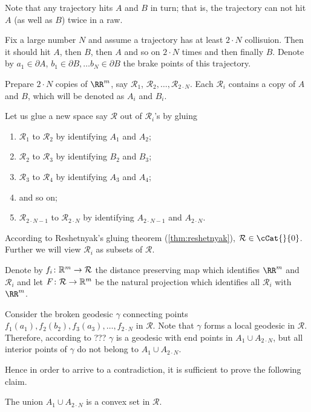 Note that any trajectory hits $A$ and $B$ in turn;
that is, the trajectory can not hit $A$ (as well as $B$)
twice in a raw.

Fix a large number $N$ and assume a trajectory has at least $2\cdot N$ collisuion.
Then it should hit $A$,
then $B$,
then $A$
and so on $2\cdot N$ times
and then finally $B$.
Denote by 
$a_1\in \partial A$, 
$b_1\in \partial B,
\dots
b_N\in \partial B$
the brake points of this trajectory.

Prepare $2\cdot N$ copies of $\RR^m$,
say $\mathcal{R}_1$, $\mathcal{R}_2,\dots,\mathcal{R}_{2\cdot N}$.
Each $\mathcal{R}_i$ contains a copy of $A$ and $B$, which will be denoted as $A_i$ and $B_i$.

Let us glue a new space say $\mathcal{R}$ out of $\mathcal{R}_i$'s
by gluing 
\begin{enumerate}
\item $\mathcal{R}_1$ to $\mathcal{R}_2$ by identifying $A_1$ and $A_2$;
\item $\mathcal{R}_2$ to $\mathcal{R}_3$  by identifying $B_2$ and $B_3$;
\item $\mathcal{R}_3$ to $\mathcal{R}_4$  by identifying $A_3$ and $A_4$;
\item and so on;
\item $\mathcal{R}_{2\cdot N-1}$ to $\mathcal{R}_{2\cdot N}$ by identifying $A_{2\cdot N-1}$ and $A_{2\cdot N}$.
\end{enumerate}
According to Reshetnyak's gluing theorem (\ref{thm:reshetnyak}), $\mathcal{R}\in\cCat{}{0}$.
Further we will view $\mathcal{R}_i$ as subsets of $\mathcal{R}$.

Denote by $f_i\:\RR^m\to\mathcal{R}$ the distance preserving map which identifies $\RR^m$ and $\mathcal{R}_i$
and let $F\:\mathcal{R} \to \RR^m$ be the natural projection which identifies all $\mathcal{R}_i$ with $\RR^m$.

Consider the broken geodesic $\gamma$ connecting points $f_1(a_1),f_2(b_2),f_3(a_3),\dots,f_{2\cdot N}$ in $\mathcal{R}$.
Note that $\gamma$ forms a local geodesic in $\mathcal{R}$.
Therefore, according to ??? $\gamma$ is a geodesic with end points in $A_1\cup A_{2\cdot N}$,
but all interior points of $\gamma$ do not belong to $A_1\cup A_{2\cdot N}$.

Hence in order to arrive to a contradiction, 
it is sufficient to prove the following claim.
 
\begin{clm}{}
The union $A_1\cup A_{2\cdot N}$ is a convex set in $\mathcal{R}$.
\end{clm}

